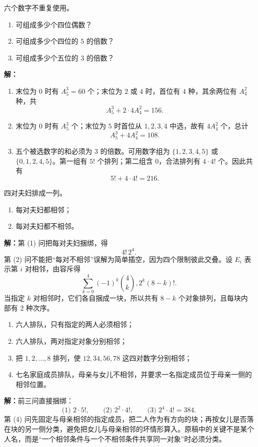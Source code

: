 \begin{examplebox}
  六个数字不重复使用。
  \begin{enumerate}
    \item 可组成多少个四位偶数？
    \item 可组成多少个四位的 $5$ 的倍数？
    \item 可组成多少个五位的 $3$ 的倍数？
  \end{enumerate}

  \textbf{解：}
  \begin{enumerate}
    \item 末位为 $0$ 时有 $A_5^3=60$ 个；末位为 $2$ 或 $4$ 时，首位有 $4$ 种，其余两位有 $A_4^2$ 种，共
      \[
        A_5^3+2\cdot4A_4^2=156.
      \]
    \item 末位为 $0$ 时有 $A_5^3$ 个；末位为 $5$ 时首位从 $1,2,3,4$ 中选，故有 $4A_4^2$ 个，总计
      \[
        A_5^3+4A_4^2=108.
      \]
    \item 五个被选数字的和必须为 $3$ 的倍数。可用数字组为
      $\{1,2,3,4,5\}$ 或 $\{0,1,2,4,5\}$。第一组有 $5!$ 个排列；第二组含 $0$，合法排列有 $4\cdot4!$ 个。因此共有
      \[
        5!+4\cdot4!=216.
      \]
  \end{enumerate}
\end{examplebox}

\begin{examplebox}
  四对夫妇排成一列。
  \begin{enumerate}
    \item 每对夫妇都相邻；
    \item 每对夫妇都不相邻。
  \end{enumerate}

  \textbf{解：}第 (1) 问把每对夫妇捆绑，得
  \[
    4!\,2^4.
  \]
  第 (2) 问不能把“每对不相邻”误解为简单插空，因为四个限制彼此交叠。设 $E_i$ 表示第 $i$ 对相邻，由容斥得
  \[
    \sum_{k=0}^{4}(-1)^k\binom4k,2^k(8-k)!.
  \]
  当指定 $k$ 对相邻时，它们各自捆成一块，所以共有 $8-k$ 个对象排列，且每块内部有 $2$ 种次序。
\end{examplebox}

\begin{examplebox}
  \begin{enumerate}
    \item 六人排队，只有指定的两人必须相邻；
    \item 六人排队，两对指定对象分别相邻；
    \item 把 $1,2,\ldots,8$ 排列，使 $12,34,56,78$ 这四对数字分别相邻；
    \item 七名家庭成员排队，母亲与女儿不相邻，并要求一名指定成员位于母亲一侧的相邻位置。
  \end{enumerate}

  \textbf{解：}前三问直接捆绑：
  \[
    \text{(1) }2\cdot5!,\qquad
    \text{(2) }2^2\cdot4!,\qquad
    \text{(3) }2^4\cdot4!=384.
  \]
  第 (4) 问先固定与母亲相邻的指定成员，把二人作为有方向的块；再按女儿是否落在块的另一侧分类，避免把女儿与母亲相邻的坏情形算入。原稿中的关键不是某个人名，而是“一个相邻条件与一个不相邻条件共享同一对象”时必须分类。
\end{examplebox}

